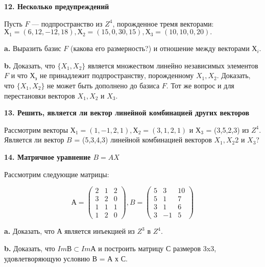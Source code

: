 \medskip

{\noindent\bf 12. Несколько предупреждений}

\medskip

Пусть $F$ — подпространство из $Z^4$, порожденное тремя векторами:\\ 
$Х_1 = (6,12, -12,18), Х_2 = (15,0,30,15), Х_3 = (10,10,0,20).$

\medskip

{\bf a.} Выразить базис $ F$ (какова его размерность?) и отношение между 
векторами $Х_i$. 

\medskip

{\bf b.} Доказать, что $\{X_1,X_2\}$ является множеством линейно 
независимых элементов $F$ и что $Х_з$ не принадлежит подпространству, 
порожденному $X_1,X_2$. Доказать, что $\{X_1,X_2\}$ не может быть дополнено до 
базиса $F$. Тот же вопрос и для перестановки векторов $X_1,X_2$ и $X_3$. 

\medskip

{\noindent\bf13. Решить, является ли вектор линейной комбинацией 
других векторов}

\medskip

Рассмотрим векторы $Х_1 = (1,-1,2,1), Х_2 = (3,1,2,1)$ и 
$Х_3$ = (3,5,2,3) из $\mathit{Z}^4$. Является ли вектор $B$ = (5,3,4,3) линейной 
комбинацией векторов $X_1,X_2$2 и $X_3$? 

\medskip

{\noindent\bf14. Матричное уравнение $B = AX$}

\medskip

Рассмотрим следующие матрицы: 


$$А =\begin{pmatrix}
2 & 1 & 2 \\
3 & 2 & 0 \\
1 & 1 & 1 \\
1 & 2 & 0 
\end{pmatrix},
B =\begin{pmatrix}
5 & 3 & 10 \\
5 & 1 & 7 \\
3 & 1 & 6 \\
3 & -1 & 5 
\end{pmatrix}$$

\medskip

{\bf a.} Доказать, что А является инъекцией из $\mathit{Z}^3$ в $\mathit{Z}^4$. 

\medskip

{\bf b.} Доказать, что $ImВ \subset ImА$ и построить матрицу С размеров 
3x3, удовлетворяющую условию В = А х С. 

